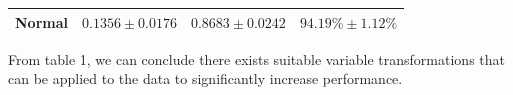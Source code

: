 \documentclass[portrait,final,x11names,a1paper,fontscale=0.4]{baposter}
\begin{document}
\begin{poster}
{\begin{center}
\begin{tabular}{c|c|c|c}
    Normal & $ 0.1356 \pm 0.0176$ & $ 0.8683 \pm 0.0242$ & $ 94.19\% \pm 1.12\%$ \\
    \bottomrule
\end{tabular}
\end{center}
From table 1, we can conclude there exists suitable variable transformations that can be applied to the data to
significantly increase performance.
}

\end{poster}
\end{document}
